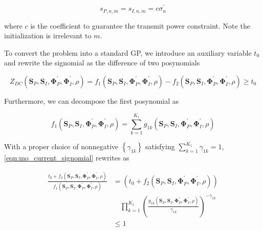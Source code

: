 \begin{equation}\label{eqn:mo_initial_amplitude}
  {s_{P,n,m}} = {s_{I,n,m}} = c\sigma _n^\prime 
\end{equation}

where $c$ is the coefficient to guarantee the transmit power constraint. Note the initialization is irrelevant to $m$.

To convert the problem into a standard GP, we introduce an auxiliary variable ${t_0}$ and rewrite the signomial as the difference of two posynomials

\begin{equation}\label{eqn:mo_current_signomial}
  {Z_{DC}}\left( {{{\mathbf{S}}_P},{{\mathbf{S}}_I},{\mathbf{\Phi }}_P^\prime ,{\mathbf{\Phi }}_I^\prime ,\rho } \right) = {f_1}\left( {{{\mathbf{S}}_P},{{\mathbf{S}}_I},{\mathbf{\Phi }}_P^\prime ,{\mathbf{\Phi }}_I^\prime ,\rho } \right) - {f_2}\left( {{{\mathbf{S}}_P},{{\mathbf{S}}_I},{\mathbf{\Phi }}_P^\prime ,{\mathbf{\Phi }}_I^\prime ,\rho } \right) \geqslant {t_0}
\end{equation}

Furthermore, we can decompose the first posynomial as

\begin{equation}\label{eqn:mo_current_posynomial}
  {f_1}\left( {{{\mathbf{S}}_P},{{\mathbf{S}}_I},{\mathbf{\Phi }}_P^\prime ,{\mathbf{\Phi }}_I^\prime ,\rho } \right) = \sum\limits_{k = 1}^{{K_1}} {{g_{1k}}} \left( {{{\mathbf{S}}_P},{{\mathbf{S}}_I},{\mathbf{\Phi }}_P^\prime ,{\mathbf{\Phi }}_I^\prime ,\rho } \right)
\end{equation}

With a proper choice of nonnegative $\left\{ {{\gamma _{1k}}} \right\}$ satisfying $\sum\nolimits_{k = 1}^{{K_1}} {{\gamma _{1k}}}  = 1$, \eqref{eqn:mo_current_signomial} rewrites as

\begin{align}\label{eqn:mo_current_signomial_rewritten}
  \frac{{{t_0} + {f_2}\left( {{{\mathbf{S}}_P},{{\mathbf{S}}_I},{\mathbf{\Phi }}_P^\prime ,{\mathbf{\Phi }}_I^\prime ,\rho } \right)}}{{{f_1}\left( {{{\mathbf{S}}_P},{{\mathbf{S}}_I},{\mathbf{\Phi }}_P^\prime ,{\mathbf{\Phi }}_I^\prime ,\rho } \right)}} &= \left( {{t_0} + {f_2}\left( {{{\mathbf{S}}_P},{{\mathbf{S}}_I},{\mathbf{\Phi }}_P^\prime ,{\mathbf{\Phi }}_I^\prime ,\rho } \right)} \right) \nonumber \\
  &\quad \prod\limits_{k = 1}^{{K_1}} {{{\left( {\frac{{{g_{1k}}\left( {{{\mathbf{S}}_P},{{\mathbf{S}}_I},{\mathbf{\Phi }}_P^\prime ,{\mathbf{\Phi }}_I^\prime ,\rho } \right)}}{{{\gamma _{1k}}}}} \right)}^{ - {\gamma _{1k}}}}} \\
  &\leqslant 1
\end{align}


